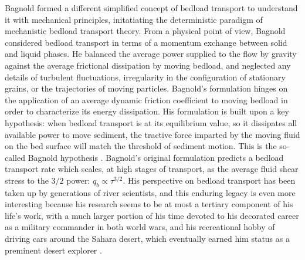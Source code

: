 \documentclass{article}
\begin{document}
Bagnold formed a different simplified concept of bedload transport to understand it with mechanical principles, initatiating the deterministic paradigm of mechanistic bedload transport theory. 
From a physical point of view, Bagnold considered bedload transport in terms of a momentum exchange between solid and liquid phases.
He balanced the average power supplied to the flow by gravity against the average frictional dissipation by moving bedload, and neglected any details of turbulent fluctuations, irregularity in the configuration of stationary grains, or the trajectories of moving particles.
Bagnold's formulation hinges on the application of an average dynamic friction coefficient to moving bedload in order to characterize its energy dissipation. 
His formulation is built upon a key hypothesis: when bedload transport is at its equilibrium value, so it dissipates all available power to move sediment, the tractive force imparted by the moving fluid on the bed surface will match the threshold of sediment motion. 
This is the so-called Bagnold hypothesis \citep{Engelund1976, Luque1976, Seminara2002, Ancey2006}.
Bagnold's original formulation predicts a bedload transport rate which scales, at high stages of transport, as the average fluid shear stress to the $3/2$ power: $q_b \propto \tau^{3/2}.$ 
His perspective on bedload transport has been taken up by generations of river scientists, and this enduring legacy is even more interesting because his research seems to be at most a tertiary component of his life's work, with a much larger portion of his time devoted to his decorated career as a military commander in both world wars, and his recreational hobby of driving cars around the Sahara desert, which eventually earned him status as a preminent desert explorer \citep{Bagnold1988}. 
\end{document}
